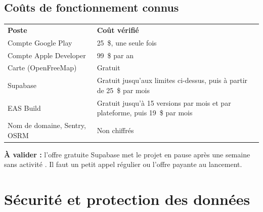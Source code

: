 \documentclass[11pt,a4paper]{article}
\newcommand{\hd}[1]{\textbf{\color{white}#1}}
\newcommand{\hdrow}{\rowcolor{brand}}
\newcommand{\valider}[1]{\begin{avalider}\textbf{À valider :} #1\end{avalider}}
\begin{document}
\subsection{Coûts de fonctionnement connus}
\begin{xltabular}{\textwidth}{@{}l Y@{}}
\hdrow \hd{Poste} & \hd{Coût vérifié} \\
Compte Google Play & 25~\$, une seule fois \cite{stores} \\
Compte Apple Developer & 99~\$ par an \cite{stores} \\
Carte (OpenFreeMap) & Gratuit \cite{openfreemap} \\
Supabase & Gratuit jusqu'aux limites ci-dessus, puis à partir de 25~\$ par mois \cite{supabase} \\
EAS Build & Gratuit jusqu'à 15 versions par mois et par plateforme, puis 19~\$ par mois \cite{expo} \\
Nom de domaine, Sentry, OSRM & Non chiffrés \\
\end{xltabular}
\valider{l'offre gratuite Supabase met le projet en pause après une semaine sans activité \cite{supabase}. Il faut un petit appel régulier ou l'offre payante au lancement.}

\Needspace{8cm}
\section{Sécurité et protection des données}
\end{document}
